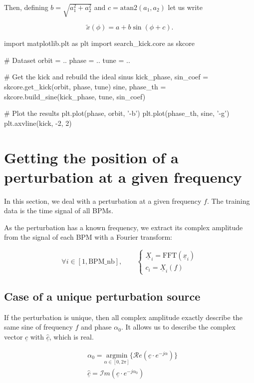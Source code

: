 \documentclass[12pt,a4paper]{article}
\renewcommand{\vec}[1]{\underline{#1}}
\begin{document}
	Then, defining $b = \sqrt{a_1^2+a_2^2}$ and $c = \mathrm{atan2}(a_1, a_2)$ let us write
	
	\begin{equation*}
		\tilde{x}(\phi) = a + b \sin(\phi + c).
	\end{equation*} 
		
	\begin{python}[caption=Get the kick]
		import matplotlib.plt as plt
		import search_kick.core as skcore
		
		# Dataset
		orbit = ..
		phase = ..
		tune = ..
		
		# Get the kick and rebuild the ideal sinus
		kick_phase, sin_coef = skcore.get_kick(orbit, phase, tune)
		sine, phase_th = skcore.build_sine(kick_phase, tune, sin_coef)
		
		# Plot the results
		plt.plot(phase, orbit, '-b')
		plt.plot(phase_th, sine, '-g')
		plt.axvline(kick, -2, 2)	
	\end{python}
	
	
	\section{Getting the position of a perturbation at a given frequency}
	In this section, we deal with a perturbation at a given frequency $f$. The training data is the time signal of all BPMs.
	
	As the perturbation has a known frequency, we extract its complex amplitude from the signal of each BPM with a Fourier transform:
	
	\begin{equation}
	\forall i \in [1, \mathrm{BPM\_nb}], \qquad 
	\begin{cases}
	\vec{X}_i = \mathrm{FFT}(\vec{x}_i) \\
	c_i = \vec{X}_i(f)
	\end{cases}
	\end{equation}
	
	\subsection{Case of a unique perturbation source}

	If the perturbation is unique, then all complex amplitude exactly describe the same sine of frequency $f$ and phase $\alpha_0$. It allows us to describe the complex vector $\vec{c}$ with $\vec{\hat{c}}$, which is real.
	
	\begin{align}
		&\alpha_0 = \underset{\alpha \in [0, 2\pi]}{\textrm{argmin}}\{\mathcal{R}e (\vec{c} \cdot e^{-j\alpha}) \} \\
		&\vec{\hat{c}} = \mathcal{I}m (\vec{c} \cdot e^{-j\alpha_0})
	\end{align}
	
\end{document}
